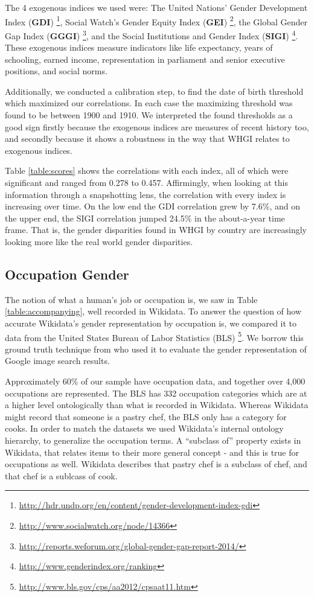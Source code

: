 \documentclass[letterpaper]{article}
\begin{document}
The 4 exogenous indices we used were: The United Nations' Gender Development Index (\textbf{GDI})  \footnote{\url{http://hdr.undp.org/en/content/gender-development-index-gdi}},  Social Watch's Gender Equity Index (\textbf{GEI}) \footnote{\url{http://www.socialwatch.org/node/14366}},  the Global Gender Gap Index (\textbf{GGGI}) \footnote{\url{http://reports.weforum.org/global-gender-gap-report-2014/}}, and the Social Institutions and Gender Index (\textbf{SIGI}) \footnote{\url{http://www.genderindex.org/ranking}}.
These exogenous indices measure indicators like life expectancy, years of schooling, earned income, representation in parliament and senior executive positions, and social norms.

Additionally, we conducted a calibration step, to find the date of birth threshold which maximized our correlations. In each case the maximizing threshold was found to be between 1900 and 1910. We interpreted the found thresholds as a good sign firstly because the exogenous indices are measures of recent history too, and secondly because it shows a robustness in the way that WHGI relates to exogenous indices.

Table \ref{table:scores} shows the correlations with each index, all of which were significant and ranged from 0.278 to 0.457. Affirmingly, when looking at this information through a snapshotting lens, the correlation with every index is increasing over time. On the low end the GDI correlation grew by 7.6\%, and on the upper end, the SIGI correlation jumped 24.5\% in the about-a-year time frame. That is, the gender disparities found in WHGI by country are increasingly looking more like the real world gender disparities.


\subsection{Occupation Gender}
The notion of what a human's job or occupation is, we saw in Table \ref{table:accompanying}, well recorded in Wikidata. To answer the question of how accurate Wikidata's gender representation by occupation is, we compared it to data from the United States Bureau of Labor Statistics (BLS) \footnote{\url{http://www.bls.gov/cps/aa2012/cpsaat11.htm}}. We borrow this ground truth technique from \cite{kay_unequal_2015} who used it to evaluate the gender representation of Google image search results.

Approximately 60\% of our sample have occupation data, and together over 4,000 occupations are represented. The BLS has 332 occupation categories which are at a higher level ontologically than what is recorded in Wikidata. Whereas Wikidata might record that someone is a pastry chef, the BLS only has a category for cooks. In order to match the datasets we used Wikidata's internal ontology hierarchy, to generalize the occupation terms. A ``subclass of'' property exists in Wikidata, that relates items to their more general concept - and this is true for occupations as well. Wikidata describes that pastry chef is a subclass of chef, and that chef is a sublcass of cook.
\end{document}
